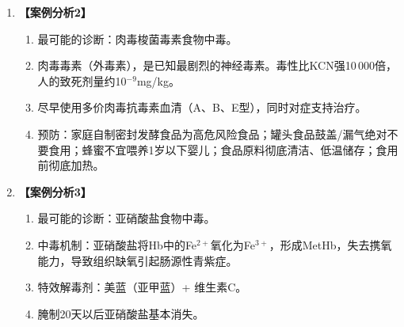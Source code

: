 {\begin{enumerate}[leftmargin=*]
    \item \textbf{【案例分析2】}
    \begin{enumerate}[leftmargin=*]
        \item 最可能的诊断：肉毒梭菌毒素食物中毒。
        \item 肉毒毒素（外毒素），是已知最剧烈的神经毒素。毒性比KCN强10\,000倍，人的致死剂量约10$^{-9}$mg/kg。
        \item 尽早使用多价肉毒抗毒素血清（A、B、E型），同时对症支持治疗。
        \item 预防：家庭自制密封发酵食品为高危风险食品；罐头食品鼓盖/漏气绝对不要食用；蜂蜜不宜喂养1岁以下婴儿；食品原料彻底清洁、低温储存；食用前彻底加热。
    \end{enumerate}

    \item \textbf{【案例分析3】}
    \begin{enumerate}[leftmargin=*]
        \item 最可能的诊断：亚硝酸盐食物中毒。
        \item 中毒机制：亚硝酸盐将Hb中的Fe$^{2+}$氧化为Fe$^{3+}$，形成MetHb，失去携氧能力，导致组织缺氧引起肠源性青紫症。
        \item 特效解毒剂：美蓝（亚甲蓝）+ 维生素C。
        \item 腌制20天以后亚硝酸盐基本消失。
    \end{enumerate}
\end{enumerate}

\newpage
}
